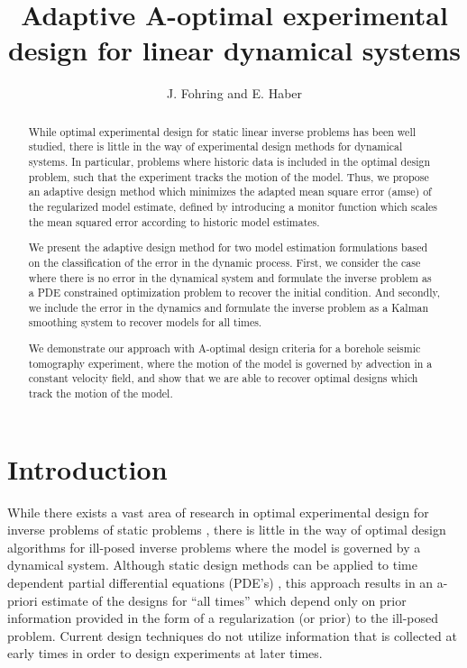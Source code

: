 \documentclass[11pt]{article}
\begin{document}
\title{ Adaptive A-optimal experimental design for linear dynamical systems}
\author{J. Fohring and E. Haber }
\maketitle


\begin{abstract}
While optimal experimental design for static linear inverse problems has been well studied, there is little in the way of experimental design methods for dynamical systems. 
In particular, problems where historic data is included in the optimal design problem, such that the experiment tracks the motion of the model. 
Thus, we propose an adaptive design method which minimizes the adapted mean square error (amse) of the regularized model estimate, defined by introducing a monitor function which scales the mean squared error according to historic model estimates. 

We present the adaptive design method for two model estimation formulations based on the classification of the error in the dynamic process. 
First, we consider the case where there is no error in the dynamical system and formulate the inverse problem as a PDE constrained optimization problem to recover the initial condition. 
And secondly, we include the error in the dynamics and formulate the inverse problem as a Kalman smoothing system to recover models for all times. 

We demonstrate our approach with A-optimal design criteria  for a borehole seismic tomography experiment, where the motion of the  model is governed by  advection in a constant velocity field, and show that we are able to recover optimal designs which track the motion of the model. 


\end{abstract}


\section{Introduction}
While there exists a vast area of research in optimal experimental design for  inverse problems  of static problems \cite{Haber2011,Haber2008,Haber2010,Bardow2008,Chaloner1995,Curtis1999,Atkinson1992,Pukelsheim1993a,Ajo-Franklin2009,Fedorov1972}, there is little in the way of optimal design algorithms for ill-posed inverse problems where the model is governed by a dynamical system. Although static design methods can be applied to time dependent partial differential equations (PDE's) \cite{Alexanderian2014,Haber2011}, this approach results in an a-priori estimate of the designs for ``all times''  which depend only on prior information provided in the form of a regularization (or prior) to the ill-posed problem.  Current design techniques do not utilize information that is collected at early times in order
 to design experiments at later times.
 
\end{document}
